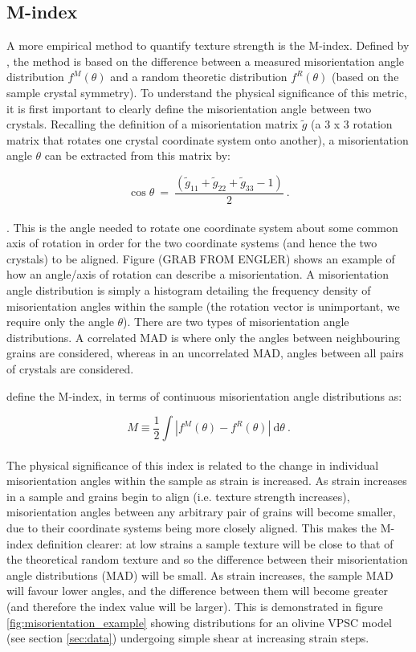 \documentclass[a4paper,12pt]{report}
\numberwithin{equation}{chapter}
\begin{document}
\subsection{M-index} \label{subsec:Mindex}
A more empirical method to quantify texture strength is the M-index. Defined by \cite{Skemer}, the method is based on the difference between a measured misorientation angle distribution $f^M(\theta)$ and a random theoretic distribution $f^R(\theta)$ (based on the sample crystal symmetry). To understand the physical significance of this metric, it is first important to clearly define the misorientation angle between two crystals. Recalling the definition of a misorientation matrix $\tilde{g}$ (a 3 x 3 rotation matrix that rotates one crystal coordinate system onto another), a misorientation angle $\theta$ can be extracted from this matrix by:

\begin{equation}
\cos{\theta}\ =\ \frac{(\tilde{g}_{11} + \tilde{g}_{22} + \tilde{g}_{33} - 1)}{2}\ .
\end{equation} 
\\
\citep{Randle2000}. This is the angle needed to rotate one coordinate system about some common axis of rotation in order for the two coordinate systems (and hence the two crystals) to be aligned. Figure (GRAB FROM ENGLER) shows an example of how an angle/axis of rotation can describe a misorientation. A misorientation angle distribution is simply a histogram detailing the frequency density of misorientation angles within the sample (the rotation vector is unimportant, we require only the angle $\theta$). There are two types of misorientation angle distributions. A correlated MAD is where only the angles between neighbouring grains are considered, whereas in an uncorrelated MAD, angles between all pairs of crystals are considered.


\cite{Skemer} define the M-index, in terms of continuous misorientation angle distributions as:

\begin{equation} \label{eq:Mindex_cont}
M \equiv \frac{1}{2} \int | f^M(\theta) - f^R(\theta) |\ \mathrm{d}\theta \ .
\end{equation}  
\\   
The physical significance of this index is related to the change in individual misorientation angles within the sample as strain is increased. As strain increases in a sample and grains begin to align (i.e. texture strength increases), misorientation angles between any arbitrary pair of grains will become smaller, due to their coordinate systems being more closely aligned. This makes the M-index definition clearer: at low strains a sample texture will be close to that of the theoretical random texture and so the difference between their misorientation angle distributions (MAD) will be small. As strain increases, the sample MAD will favour lower angles, and the difference between them will become greater (and therefore the index value will be larger). This is demonstrated in figure \ref{fig:misorientation_example} showing distributions for an olivine VPSC model (see section \ref{sec:data}) undergoing simple shear at increasing strain steps.
\end{document}
